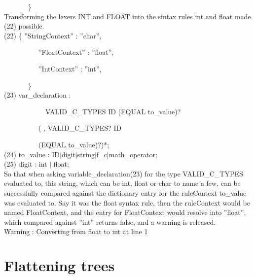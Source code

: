 \documentclass[twocolumn,10ptr]{article}
\begin{document}
	\ \ \ \ \ \ \    \}\\
	
	Transforming the lexers INT and FLOAT into the sintax rules int and float made (22) possible.\\
	
	(22)
	\{  ''StringContext'' : ''char'',
	
	\ \ \ \ \ \ \ \ \ \   ''FloatContext'' : ''float'',
	
	\ \ \ \ \ \ \ \ \ \   ''IntContext'' : ''int'',  
	
	\ \ \ \ \ \ \    \}\\
	
	
	(23) var\_declaration : 
	
	\ \ \ \ \ \ \ \ \ \ \ \  VALID\_C\_TYPES ID (EQUAL to\_value)?
	
	\ \ \ \ \ \ \ \ \ \    (\textsc{} ,\textsc{}  VALID\_C\_TYPES? ID 
	
	\ \ \ \ \ \ \ \ \ \   (EQUAL to\_value)?)*;\\
	(24) to\_value : ID\(\mid\)digit\(\mid\)string\(\mid\)f\_c\(\mid\)math\_operator;\\
	(25) digit : int \(\mid\) float;\\
	
	So that when asking variable\_declaration(23) for the type VALID\_C\_TYPES evaluated to, this string, which can be \textsc{}int\textsc{}, \textsc{}float\textsc{} or \textsc{}char\textsc{} to name a few, can be successfully compared against the dictionary entry for the ruleContext to\_value was evaluated to. Say it was the float syntax rule, then the ruleContext would be named FloatContext, and the entry for FloatContext would resolve into  ''float'', which compared against  ''int'' returns false, and a warning is released.\\
	
	Warning : Converting from float to int at line 1\\
	
	
	
	
	
	
	
	
	
	
	
	
	
	
	
	
	\section{Flattening trees}
\end{document}
